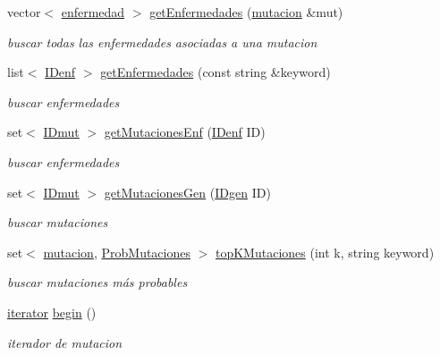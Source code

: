 \begin{DoxyCompactItemize}
vector$<$ \hyperlink{classenfermedad}{enfermedad} $>$ \hyperlink{classclinvar_aa0c4612fb169044098e02b03d85022c1}{get\+Enfermedades} (\hyperlink{classmutacion}{mutacion} \&mut)
\begin{DoxyCompactList}\small\item\em buscar todas las enfermedades asociadas a una mutacion \end{DoxyCompactList}\item 
list$<$ \hyperlink{classclinvar_a2c121e1c9c137330a57590fe9f4e65ab}{I\+Denf} $>$ \hyperlink{classclinvar_ab1dabd9f905dcb76dbd3f44f0bcf9f24}{get\+Enfermedades} (const string \&keyword)
\begin{DoxyCompactList}\small\item\em buscar enfermedades \end{DoxyCompactList}\item 
set$<$ \hyperlink{classclinvar_a4ad33b1d063a729b56ea6ed9e4e2700d}{I\+Dmut} $>$ \hyperlink{classclinvar_a62a1874ef6f517be56124c3ba755681f}{get\+Mutaciones\+Enf} (\hyperlink{classclinvar_a2c121e1c9c137330a57590fe9f4e65ab}{I\+Denf} ID)
\begin{DoxyCompactList}\small\item\em buscar enfermedades \end{DoxyCompactList}\item 
set$<$ \hyperlink{classclinvar_a4ad33b1d063a729b56ea6ed9e4e2700d}{I\+Dmut} $>$ \hyperlink{classclinvar_af33aec5fec0e24ffa6c1617fc8c62281}{get\+Mutaciones\+Gen} (\hyperlink{classclinvar_aa6cdb39378649a250def3e20163d3113}{I\+Dgen} ID)
\begin{DoxyCompactList}\small\item\em buscar mutaciones \end{DoxyCompactList}\item 
set$<$ \hyperlink{classmutacion}{mutacion}, \hyperlink{classProbMutaciones}{Prob\+Mutaciones} $>$ \hyperlink{classclinvar_a9041a5ec6eef333aa20c6d0c6ca7f26f}{top\+K\+Mutaciones} (int k, string keyword)
\begin{DoxyCompactList}\small\item\em buscar mutaciones más probables \end{DoxyCompactList}\item 
\hyperlink{classclinvar_1_1iterator}{iterator} \hyperlink{classclinvar_a1e6b62ceb84e40472b3119947a405453}{begin} ()
\begin{DoxyCompactList}\small\item\em iterador de mutacion \end{DoxyCompactList}\item 

\end{DoxyCompactItemize}
